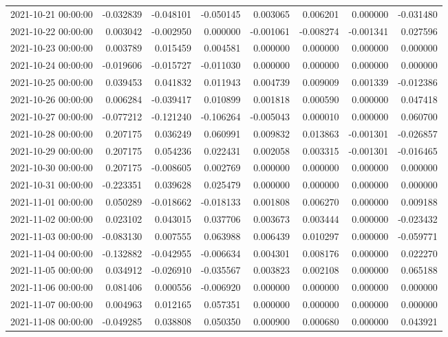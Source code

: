 \begin{tabular}{lrrrrrrr}
2021-10-21 00:00:00 & -0.032839 & -0.048101 & -0.050145 & 0.003065 & 0.006201 & 0.000000 & -0.031480 \\
2021-10-22 00:00:00 & 0.003042 & -0.002950 & 0.000000 & -0.001061 & -0.008274 & -0.001341 & 0.027596 \\
2021-10-23 00:00:00 & 0.003789 & 0.015459 & 0.004581 & 0.000000 & 0.000000 & 0.000000 & 0.000000 \\
2021-10-24 00:00:00 & -0.019606 & -0.015727 & -0.011030 & 0.000000 & 0.000000 & 0.000000 & 0.000000 \\
2021-10-25 00:00:00 & 0.039453 & 0.041832 & 0.011943 & 0.004739 & 0.009009 & 0.001339 & -0.012386 \\
2021-10-26 00:00:00 & 0.006284 & -0.039417 & 0.010899 & 0.001818 & 0.000590 & 0.000000 & 0.047418 \\
2021-10-27 00:00:00 & -0.077212 & -0.121240 & -0.106264 & -0.005043 & 0.000010 & 0.000000 & 0.060700 \\
2021-10-28 00:00:00 & 0.207175 & 0.036249 & 0.060991 & 0.009832 & 0.013863 & -0.001301 & -0.026857 \\
2021-10-29 00:00:00 & 0.207175 & 0.054236 & 0.022431 & 0.002058 & 0.003315 & -0.001301 & -0.016465 \\
2021-10-30 00:00:00 & 0.207175 & -0.008605 & 0.002769 & 0.000000 & 0.000000 & 0.000000 & 0.000000 \\
2021-10-31 00:00:00 & -0.223351 & 0.039628 & 0.025479 & 0.000000 & 0.000000 & 0.000000 & 0.000000 \\
2021-11-01 00:00:00 & 0.050289 & -0.018662 & -0.018133 & 0.001808 & 0.006270 & 0.000000 & 0.009188 \\
2021-11-02 00:00:00 & 0.023102 & 0.043015 & 0.037706 & 0.003673 & 0.003444 & 0.000000 & -0.023432 \\
2021-11-03 00:00:00 & -0.083130 & 0.007555 & 0.063988 & 0.006439 & 0.010297 & 0.000000 & -0.059771 \\
2021-11-04 00:00:00 & -0.132882 & -0.042955 & -0.006634 & 0.004301 & 0.008176 & 0.000000 & 0.022270 \\
2021-11-05 00:00:00 & 0.034912 & -0.026910 & -0.035567 & 0.003823 & 0.002108 & 0.000000 & 0.065188 \\
2021-11-06 00:00:00 & 0.081406 & 0.000556 & -0.006920 & 0.000000 & 0.000000 & 0.000000 & 0.000000 \\
2021-11-07 00:00:00 & 0.004963 & 0.012165 & 0.057351 & 0.000000 & 0.000000 & 0.000000 & 0.000000 \\
2021-11-08 00:00:00 & -0.049285 & 0.038808 & 0.050350 & 0.000900 & 0.000680 & 0.000000 & 0.043921 \\

\end{tabular}
